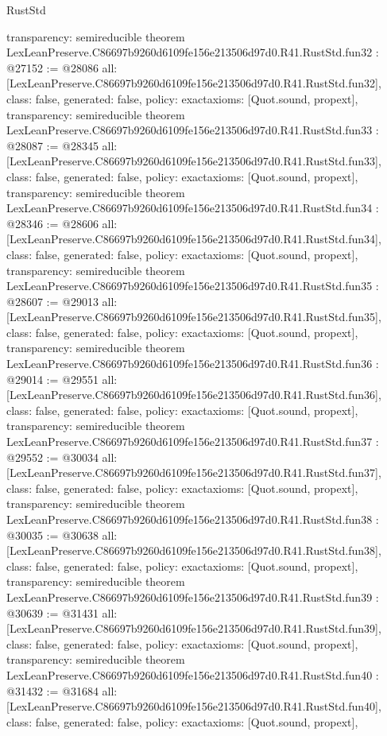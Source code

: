 \begin{lexlean}{RustStd}
\begin{coremodule}
{  transparency: semireducible
}
theorem LexLeanPreserve.C86697b9260d6109fe156e213506d97d0.R41.RustStd.fun32 : @27152 := @28086 {
  all: [LexLeanPreserve.C86697b9260d6109fe156e213506d97d0.R41.RustStd.fun32],
  class: false,
  generated: false,
  policy: exact{axioms: [Quot.sound, propext]},
  transparency: semireducible
}
theorem LexLeanPreserve.C86697b9260d6109fe156e213506d97d0.R41.RustStd.fun33 : @28087 := @28345 {
  all: [LexLeanPreserve.C86697b9260d6109fe156e213506d97d0.R41.RustStd.fun33],
  class: false,
  generated: false,
  policy: exact{axioms: [Quot.sound, propext]},
  transparency: semireducible
}
theorem LexLeanPreserve.C86697b9260d6109fe156e213506d97d0.R41.RustStd.fun34 : @28346 := @28606 {
  all: [LexLeanPreserve.C86697b9260d6109fe156e213506d97d0.R41.RustStd.fun34],
  class: false,
  generated: false,
  policy: exact{axioms: [Quot.sound, propext]},
  transparency: semireducible
}
theorem LexLeanPreserve.C86697b9260d6109fe156e213506d97d0.R41.RustStd.fun35 : @28607 := @29013 {
  all: [LexLeanPreserve.C86697b9260d6109fe156e213506d97d0.R41.RustStd.fun35],
  class: false,
  generated: false,
  policy: exact{axioms: [Quot.sound, propext]},
  transparency: semireducible
}
theorem LexLeanPreserve.C86697b9260d6109fe156e213506d97d0.R41.RustStd.fun36 : @29014 := @29551 {
  all: [LexLeanPreserve.C86697b9260d6109fe156e213506d97d0.R41.RustStd.fun36],
  class: false,
  generated: false,
  policy: exact{axioms: [Quot.sound, propext]},
  transparency: semireducible
}
theorem LexLeanPreserve.C86697b9260d6109fe156e213506d97d0.R41.RustStd.fun37 : @29552 := @30034 {
  all: [LexLeanPreserve.C86697b9260d6109fe156e213506d97d0.R41.RustStd.fun37],
  class: false,
  generated: false,
  policy: exact{axioms: [Quot.sound, propext]},
  transparency: semireducible
}
theorem LexLeanPreserve.C86697b9260d6109fe156e213506d97d0.R41.RustStd.fun38 : @30035 := @30638 {
  all: [LexLeanPreserve.C86697b9260d6109fe156e213506d97d0.R41.RustStd.fun38],
  class: false,
  generated: false,
  policy: exact{axioms: [Quot.sound, propext]},
  transparency: semireducible
}
theorem LexLeanPreserve.C86697b9260d6109fe156e213506d97d0.R41.RustStd.fun39 : @30639 := @31431 {
  all: [LexLeanPreserve.C86697b9260d6109fe156e213506d97d0.R41.RustStd.fun39],
  class: false,
  generated: false,
  policy: exact{axioms: [Quot.sound, propext]},
  transparency: semireducible
}
theorem LexLeanPreserve.C86697b9260d6109fe156e213506d97d0.R41.RustStd.fun40 : @31432 := @31684 {
  all: [LexLeanPreserve.C86697b9260d6109fe156e213506d97d0.R41.RustStd.fun40],
  class: false,
  generated: false,
  policy: exact{axioms: [Quot.sound, propext]},
}
\end{coremodule}
\end{lexlean}
